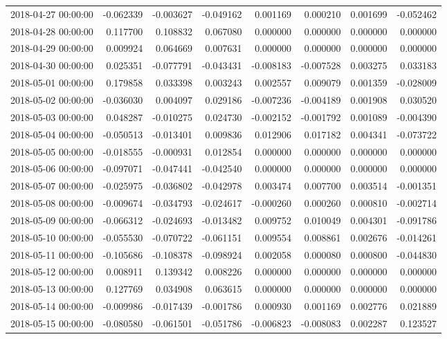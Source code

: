 \begin{tabular}{lrrrrrrr}
2018-04-27 00:00:00 & -0.062339 & -0.003627 & -0.049162 & 0.001169 & 0.000210 & 0.001699 & -0.052462 \\
2018-04-28 00:00:00 & 0.117700 & 0.108832 & 0.067080 & 0.000000 & 0.000000 & 0.000000 & 0.000000 \\
2018-04-29 00:00:00 & 0.009924 & 0.064669 & 0.007631 & 0.000000 & 0.000000 & 0.000000 & 0.000000 \\
2018-04-30 00:00:00 & 0.025351 & -0.077791 & -0.043431 & -0.008183 & -0.007528 & 0.003275 & 0.033183 \\
2018-05-01 00:00:00 & 0.179858 & 0.033398 & 0.003243 & 0.002557 & 0.009079 & 0.001359 & -0.028009 \\
2018-05-02 00:00:00 & -0.036030 & 0.004097 & 0.029186 & -0.007236 & -0.004189 & 0.001908 & 0.030520 \\
2018-05-03 00:00:00 & 0.048287 & -0.010275 & 0.024730 & -0.002152 & -0.001792 & 0.001089 & -0.004390 \\
2018-05-04 00:00:00 & -0.050513 & -0.013401 & 0.009836 & 0.012906 & 0.017182 & 0.004341 & -0.073722 \\
2018-05-05 00:00:00 & -0.018555 & -0.000931 & 0.012854 & 0.000000 & 0.000000 & 0.000000 & 0.000000 \\
2018-05-06 00:00:00 & -0.097071 & -0.047441 & -0.042540 & 0.000000 & 0.000000 & 0.000000 & 0.000000 \\
2018-05-07 00:00:00 & -0.025975 & -0.036802 & -0.042978 & 0.003474 & 0.007700 & 0.003514 & -0.001351 \\
2018-05-08 00:00:00 & -0.009674 & -0.034793 & -0.024617 & -0.000260 & 0.000260 & 0.000810 & -0.002714 \\
2018-05-09 00:00:00 & -0.066312 & -0.024693 & -0.013482 & 0.009752 & 0.010049 & 0.004301 & -0.091786 \\
2018-05-10 00:00:00 & -0.055530 & -0.070722 & -0.061151 & 0.009554 & 0.008861 & 0.002676 & -0.014261 \\
2018-05-11 00:00:00 & -0.105686 & -0.108378 & -0.098924 & 0.002058 & 0.000080 & 0.000800 & -0.044830 \\
2018-05-12 00:00:00 & 0.008911 & 0.139342 & 0.008226 & 0.000000 & 0.000000 & 0.000000 & 0.000000 \\
2018-05-13 00:00:00 & 0.127769 & 0.034908 & 0.063615 & 0.000000 & 0.000000 & 0.000000 & 0.000000 \\
2018-05-14 00:00:00 & -0.009986 & -0.017439 & -0.001786 & 0.000930 & 0.001169 & 0.002776 & 0.021889 \\
2018-05-15 00:00:00 & -0.080580 & -0.061501 & -0.051786 & -0.006823 & -0.008083 & 0.002287 & 0.123527 \\

\end{tabular}
